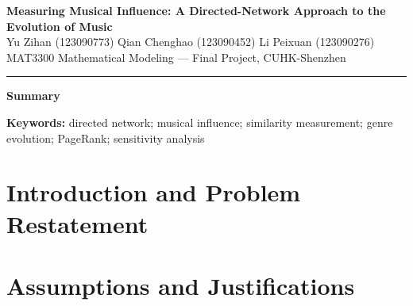 \documentclass[11pt,letterpaper]{article}
\numberwithin{equation}{section}
\newcommand{\TeamMembers}{%
  Yu Zihan (123090773)\quad
  Qian Chenghao (123090452)\quad
  Li Peixuan (123090276)}
\begin{document}

\thispagestyle{empty}
\begin{center}
  {\LARGE\bfseries Measuring Musical Influence: A Directed-Network Approach
   to the Evolution of Music}\\[10pt]
  {\normalsize \TeamMembers}\\[4pt]
  {\small MAT3300 Mathematical Modeling --- Final Project, CUHK-Shenzhen}
\end{center}
\vspace{0.8em}
\noindent\rule{\textwidth}{0.6pt}
\vspace{0.8em}
\begin{center}
  {\Large\bfseries Summary}
\end{center}
\vspace{0.6em}
\noindent\textbf{Keywords:} directed network; musical influence; similarity
measurement; genre evolution; PageRank; sensitivity analysis
\newpage

\tableofcontents
\newpage


\section{Introduction and Problem Restatement}\label{sec:intro}

\section{Assumptions and Justifications}\label{sec:assumptions}
\end{document}
